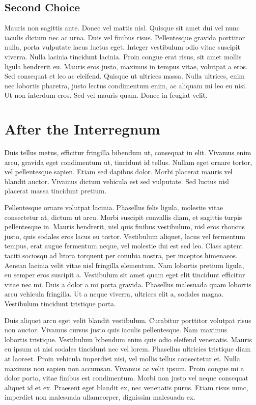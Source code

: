 \documentclass{article}
\begin{document}
\subsection{Second Choice}

Mauris non sagittis ante. Donec vel mattis nisl. Quisque sit amet dui
vel nunc iaculis dictum nec ac urna. Duis vel finibus
risus. Pellentesque gravida porttitor nulla, porta vulputate lacus
luctus eget. Integer vestibulum odio vitae suscipit viverra. Nulla
lacinia tincidunt lacinia. Proin congue erat risus, sit amet mollis
ligula hendrerit eu. Mauris eros justo, maximus in tempus vitae,
volutpat a eros. Sed consequat et leo ac eleifend. Quisque ut ultrices
massa. Nulla ultrices, enim nec lobortis pharetra, justo lectus
condimentum enim, ac aliquam mi leo eu nisi. Ut non interdum eros. Sed
vel mauris quam. Donec in feugiat velit.

\section{After the Interregnum}

Duis tellus metus, efficitur fringilla bibendum ut, consequat in
elit. Vivamus enim arcu, gravida eget condimentum ut, tincidunt id
tellus. Nullam eget ornare tortor, vel pellentesque sapien. Etiam sed
dapibus dolor. Morbi placerat mauris vel blandit auctor. Vivamus
dictum vehicula est sed vulputate. Sed luctus nisl placerat massa
tincidunt pretium.

Pellentesque ornare volutpat lacinia. Phasellus felis ligula, molestie
vitae consectetur at, dictum ut arcu. Morbi suscipit convallis diam,
et sagittis turpis pellentesque in. Mauris hendrerit, nisl quis
finibus vestibulum, nisl eros rhoncus justo, quis sodales eros lacus
eu tortor. Vestibulum aliquet, lacus vel fermentum tempus, erat augue
fermentum neque, vel molestie dui est sed leo. Class aptent taciti
sociosqu ad litora torquent per conubia nostra, per inceptos
himenaeos. Aenean lacinia velit vitae nisl fringilla elementum. Nam
lobortis pretium ligula, eu semper eros suscipit a. Vestibulum sit
amet quam eget elit tincidunt efficitur vitae nec mi. Duis a dolor a
mi porta gravida. Phasellus malesuada quam lobortis arcu vehicula
fringilla. Ut a neque viverra, ultrices elit a, sodales
magna. Vestibulum tincidunt tristique porta.

Duis aliquet arcu eget velit blandit vestibulum. Curabitur porttitor
volutpat risus non auctor. Vivamus cursus justo quis iaculis
pellentesque. Nam maximus lobortis tristique. Vestibulum bibendum enim
quis odio eleifend venenatis. Mauris eu ipsum at nisi sodales
tincidunt nec vel lorem. Phasellus ultricies tristique diam at
laoreet. Proin vehicula imperdiet nisi, vel mollis tellus consectetur
et. Nulla maximus non sapien non accumsan. Vivamus ac velit
ipsum. Proin congue mi a dolor porta, vitae finibus est
condimentum. Morbi non justo vel neque consequat aliquet id et
ex. Praesent eget blandit ex, nec venenatis purus. Etiam risus nunc,
imperdiet non malesuada ullamcorper, dignissim malesuada ex.
\end{document}
